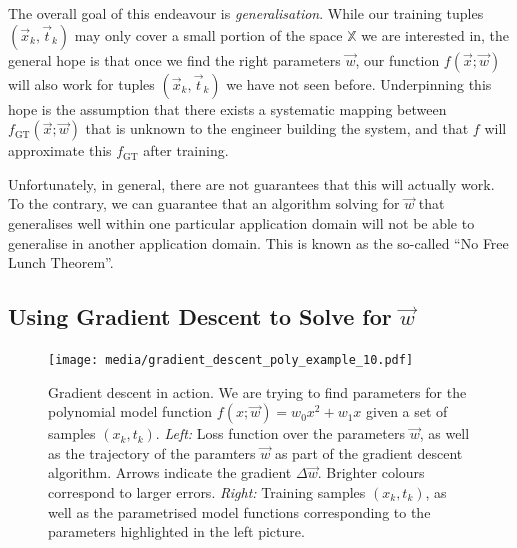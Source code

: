 \documentclass[10pt,letterpaper,oneside]{article}
\begin{document}
The overall goal of this endeavour is \emph{generalisation}. While our training tuples $(\vec x_k, \vec t_k)$ may only cover a small portion of the space $\mathbb{X}$ we are interested in, the general hope is that once we find the right parameters $\vec w$, our function $f(\vec x; \vec w)$ will also work for tuples $(\vec x_k, \vec t_k)$ we have not seen before. Underpinning this hope is the assumption that there exists a systematic mapping between $f_{\mathrm{GT}}(\vec x; \vec w)$ that is unknown to the engineer building the system, and that $f$ will approximate this $f_{\mathrm{GT}}$ after training.

Unfortunately, in general, there are not guarantees that this will actually work. To the contrary, we can guarantee that an algorithm solving for $\vec w$ that generalises well within one particular application domain will not be able to generalise in another application domain. This is known as the so-called \enquote{No Free Lunch Theorem}.


\subsection{Using Gradient Descent to Solve for $\vec w$}

\begin{figure}
	\centering
	\texttt{[image: media/gradient\_descent\_poly\_example\_10.pdf]}
	\caption{Gradient descent in action. We are trying to find parameters for the polynomial model function $f(x; \vec w) = w_0 x^2 + w_1 x$ given a set of samples $(x_k, t_k)$. \emph{Left:} Loss function over the parameters $\vec w$, as well as the trajectory of the paramters $\vec w$ as part of the gradient descent algorithm. Arrows indicate the gradient $\Delta \vec w$. Brighter colours correspond to larger errors. \emph{Right:} Training samples $(x_k, t_k)$, as well as the parametrised model functions corresponding to the parameters highlighted in the left picture. }
	\label{fig:gradient_descent_poly_example_10}
\end{figure}
\end{document}
